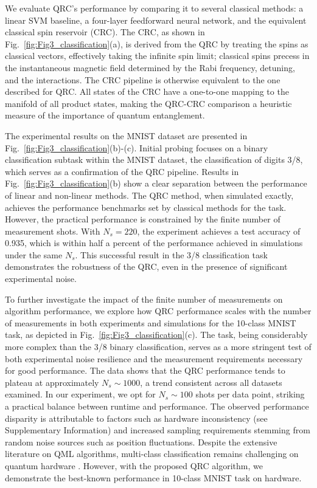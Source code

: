 \documentclass[english,floatfix,twocolumn,showpacs, aps, prx, reprint, superscriptaddress, longbibliography]{revtex4-2}
\begin{document}
We evaluate QRC's performance by comparing it to several classical methods: a linear SVM baseline, a four-layer feedforward neural network, and the equivalent classical spin reservoir (CRC). The CRC, as shown in Fig.~\ref{fig:Fig3_classification}(a), is derived from the QRC by treating the spins as classical vectors, effectively taking the infinite spin limit; classical spins precess in the instantaneous magnetic field determined by the Rabi frequency, detuning, and the interactions. The CRC pipeline is otherwise equivalent to the one described for QRC. All states of the CRC have a one-to-one mapping to the manifold of all product states, making the QRC-CRC comparison a heuristic measure of the importance of quantum entanglement.

The experimental results on the MNIST dataset are presented in Fig.~\ref{fig:Fig3_classification}(b)-(c). Initial probing focuses on a binary classification subtask within the MNIST dataset, the classification of digits 3/8, which serves as a confirmation of the QRC pipeline. Results in Fig.~\ref{fig:Fig3_classification}(b) show a clear separation between the performance of linear and non-linear methods. The QRC method, when simulated exactly, achieves the performance benchmarks set by classical methods for the task. However, the practical performance is constrained by the finite number of measurement shots. With $N_s=220$, the experiment achieves a test accuracy of 0.935, which is within half a percent of the performance achieved in simulations under the same $N_s$. This successful result in the 3/8 classification task demonstrates the robustness of the QRC, even in the presence of significant experimental noise.

To further investigate the impact of the finite number of measurements on algorithm performance, we explore how QRC performance scales with the number of measurements in both experiments and simulations for the 10-class MNIST task, as depicted in Fig.~\ref{fig:Fig3_classification}(c). The task, being considerably more complex than the 3/8 binary classification, serves as a more stringent test of both experimental noise resilience and the measurement requirements necessary for good performance. The data shows that the QRC performance tends to plateau at approximately $N_s \sim 1000$, a trend consistent across all datasets examined. In our experiment, we opt for $N_s\sim 100$ shots per data point, striking a practical balance between runtime and performance. The observed performance disparity is attributable to factors such as hardware inconsistency (see Supplementary Information) and increased sampling requirements stemming from random noise sources such as position fluctuations. Despite the extensive literature on QML algorithms, multi-class classification remains challenging on quantum hardware \cite{Pan23, Haug2023, Shen2024}. However, with the proposed QRC algorithm, we demonstrate the best-known performance in 10-class MNIST task on hardware.
\end{document}
